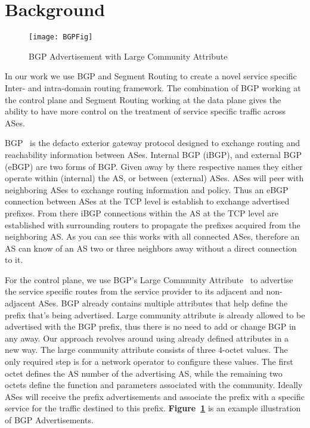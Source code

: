 

\section{Background}
\label{sec:background}

\begin{figure}
  \centering
  \texttt{[image: BGPFig]}
  \caption{BGP Advertisement with Large Community Attribute}
  \label{fig:example1}
\end{figure}
In our work we use BGP and Segment Routing to create a novel service specific Inter- and intra-domain
routing framework. The combination of BGP working at the control plane and Segment Routing working at
the data plane gives the ability to have more control on the treatment of service specific traffic across ASes.

BGP~\cite{BGPPolicy} is the defacto exterior gateway protocol designed to exchange routing and 
reachability information between ASes. Internal BGP (iBGP), and external BGP (eBGP) are two forms of 
BGP. Given away by there respective names they either operate within (internal) the AS, or between (external)
 ASes. ASes will peer with neighboring ASes to exchange routing information and policy. Thus an eBGP connection
between ASes at the TCP level is establish to exchange advertised prefixes. From there iBGP connections
within the AS at the TCP level are established with surrounding routers to propagate the prefixes acquired
from the neighboring AS. As you can see this works with all connected ASes, therefore an AS can know
of an AS two or three neighbors away without a direct connection to it. 

For the control plane, we use BGP's Large Community Attribute~\cite{largeBGP}  to advertise the service
specific routes from the service provider to its adjacent and non-adjacent ASes. BGP already contains 
multiple attributes that help define the prefix that's being advertised. Large community attribute is already
allowed to be advertised with the BGP prefix, thus there is no need to add or change BGP in any away. Our
approach revolves around using already defined attributes in a new way. The large community attribute 
consists of three 4-octet values. The only required step is for a network operator to configure these
values. The first octet defines the AS number of the advertising AS, while the remaining two octets 
define the function and parameters associated with the community. Ideally ASes will receive the prefix
advertisements and associate the prefix with a specific service for the traffic destined to this prefix. 
\textbf{Figure~\ref{fig:example1}} is an example illustration of BGP Advertisements.


